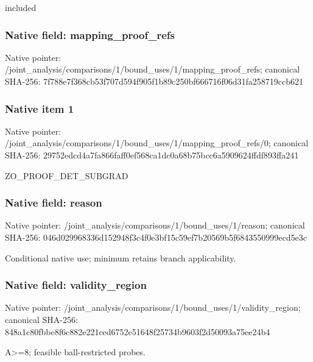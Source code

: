 \documentclass[10pt,a4paper]{article}
\begin{document}
\begingroup\raggedright\sloppy included\par\endgroup

\subsubsection{Native field: mapping\_\allowbreak{}proof\_\allowbreak{}refs}
Native pointer: /joint\_\allowbreak{}analysis/comparisons/1/bound\_\allowbreak{}uses/1/mapping\_\allowbreak{}proof\_\allowbreak{}refs; canonical SHA-256: 7f788e7f368cb53f707d594f905f1b89c250bf666716f06d31fa258719ccb621

\subsubsection{Native item 1}
Native pointer: /joint\_\allowbreak{}analysis/comparisons/1/bound\_\allowbreak{}uses/1/mapping\_\allowbreak{}proof\_\allowbreak{}refs/0; canonical SHA-256: 29752edcd4a7fa866faff0ef568ca1dc0a68b75bcc6a5909624ffdf893ffa241

\begingroup\raggedright\sloppy ZO\_\allowbreak{}PROOF\_\allowbreak{}DET\_\allowbreak{}SUBGRAD\par\endgroup

\subsubsection{Native field: reason}
Native pointer: /joint\_\allowbreak{}analysis/comparisons/1/bound\_\allowbreak{}uses/1/reason; canonical SHA-256: 046d029968336d152948f3c4f0e3bf15c59ef7b20569b5f6843550999ecd5e3c

\begingroup\raggedright\sloppy Conditional native use;\allowbreak{} minimum retains branch applicability.\par\endgroup

\subsubsection{Native field: validity\_\allowbreak{}region}
Native pointer: /joint\_\allowbreak{}analysis/comparisons/1/bound\_\allowbreak{}uses/1/validity\_\allowbreak{}region; canonical SHA-256: 848a1c80fbbe8f6c882e221ced6752e51648f25734b9603f2d50093a75ee24b4

\begingroup\raggedright\sloppy A>=\allowbreak{}8;\allowbreak{} feasible ball-restricted probes.\par\endgroup
\end{document}
